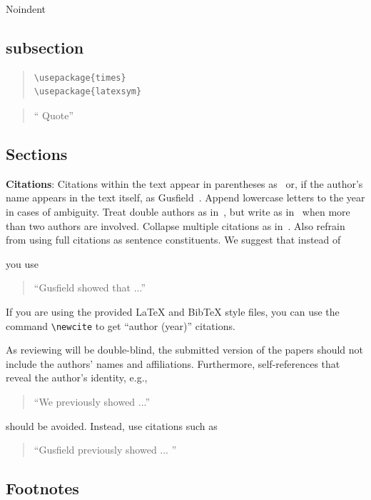 \documentclass[11pt]{article}
\begin{document}
\noindent Noindent


\subsection{subsection}

\begin{quote}
\begin{verbatim}
\usepackage{times}
\usepackage{latexsym}
\end{verbatim}
\end{quote}

\begin{quote}
  ``\cite{Graves:08} Quote''
\end{quote}

\subsection{Sections}

{\bf Citations}: Citations within the text appear in parentheses
as~\cite{Gusfield:97} or, if the author's name appears in the text
itself, as Gusfield~.  Append lowercase letters
to the year in cases of ambiguity.  Treat double authors as
in~\cite{Aho:72}, but write as in~\cite{Chandra:81} when more than two
authors are involved. Collapse multiple citations as
in~\cite{Gusfield:97,Aho:72}. Also refrain from using full citations
as sentence constituents. We suggest that instead of

you use
\begin{quote}
``Gusfield    showed that ...''
\end{quote}

If you are using the provided \LaTeX{} and Bib\TeX{} style files, you
can use the command \verb|\newcite| to get ``author (year)'' citations.

As reviewing will be double-blind, the submitted version of the papers
should not include the authors' names and affiliations. Furthermore,
self-references that reveal the author's identity, e.g.,
\begin{quote}
``We previously showed \cite{Gusfield:97} ...''  
\end{quote}
should be avoided. Instead, use citations such as 
\begin{quote}
``Gusfield 
previously showed ... ''
\end{quote}

\subsection{Footnotes}
\end{document}
